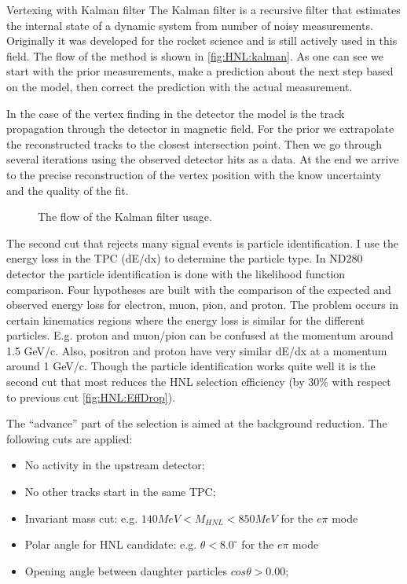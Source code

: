 \documentclass[../main.tex]{subfiles}
\begin{document}
\begin{bclogo}[couleur=blue!2, arrondi=0.1, logo=\bcinfo, nobreak=true]{Vertexing with Kalman filter}
    The Kalman filter is a recursive filter that estimates the internal state of a dynamic system from number of noisy measurements. Originally it was developed for the rocket science and is still actively used in this field. The flow of the method is shown in \autoref{fig:HNL:kalman}. As one can see we start with the prior measurements, make a prediction about the next step based on the model, then correct the prediction with the actual measurement.

    In the case of the vertex finding in the detector the model is the track propagation through the detector in magnetic field. For the prior we extrapolate the reconstructed tracks to the closest intersection point. Then we go through several iterations using the observed detector hits as a data. At the end we arrive to the precise reconstruction of the vertex position with the know uncertainty and the quality of the fit.
\end{bclogo}

\begin{figure}[!ht]
  \caption{The flow of the Kalman filter usage.}
  \label{fig:HNL:kalman}
\end{figure}

The second cut that rejects many signal events is particle identification. I use the energy loss in the TPC (dE/dx) to determine the particle type. In ND280 detector the particle identification is done with the likelihood function comparison. Four hypotheses are built with the comparison of the expected and observed energy loss for electron, muon, pion, and proton. The problem occurs in certain kinematics regions where the energy loss is similar for the different particles. E.g. proton and muon/pion can be confused at the momentum around 1.5 GeV/c. Also, positron and proton have very similar dE/dx at a momentum around 1 GeV/c. Though the particle identification works quite well it is the second cut that most reduces the HNL selection efficiency (by 30\% with respect to previous cut \autoref{fig:HNL:EffDrop}).

The ``advance'' part of the selection is aimed at the background reduction. The following cuts are applied:

\begin{itemize}
  \item No activity in the upstream detector;
  \item No other tracks start in the same TPC;
  \item Invariant mass cut: e.g. $140MeV<M_{HNL}<850MeV$ for the $e\pi$ mode
  \item Polar angle for HNL candidate: e.g. $\theta < 8.0^\circ$ for the $e\pi$ mode
  \item Opening angle between daughter particles $cos\theta >0.00$;
\end{itemize}
\end{document}
